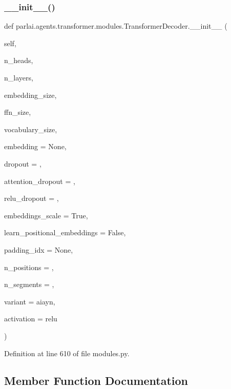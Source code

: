 \subsubsection{\texorpdfstring{\+\_\+\+\_\+init\+\_\+\+\_\+()}{\_\_init\_\_()}}
{\footnotesize\ttfamily def parlai.\+agents.\+transformer.\+modules.\+Transformer\+Decoder.\+\_\+\+\_\+init\+\_\+\+\_\+ (\begin{DoxyParamCaption}\item[{}]{self,  }\item[{}]{n\+\_\+heads,  }\item[{}]{n\+\_\+layers,  }\item[{}]{embedding\+\_\+size,  }\item[{}]{ffn\+\_\+size,  }\item[{}]{vocabulary\+\_\+size,  }\item[{}]{embedding = {\ttfamily None},  }\item[{}]{dropout = {},  }\item[{}]{attention\+\_\+dropout = {},  }\item[{}]{relu\+\_\+dropout = {},  }\item[{}]{embeddings\+\_\+scale = {\ttfamily True},  }\item[{}]{learn\+\_\+positional\+\_\+embeddings = {\ttfamily False},  }\item[{}]{padding\+\_\+idx = {\ttfamily None},  }\item[{}]{n\+\_\+positions = {},  }\item[{}]{n\+\_\+segments = {},  }\item[{}]{variant = {\ttfamily \textquotesingle{}aiayn\textquotesingle{}},  }\item[{}]{activation = {\ttfamily \textquotesingle{}relu\textquotesingle{}} }\end{DoxyParamCaption})}



Definition at line 610 of file modules.\+py.



\subsection{Member Function Documentation}
\mbox{\label{classparlai_1_1agents_1_1transformer_1_1modules_1_1TransformerDecoder_a19b2e9eecef1384bcfa9f772cac24a20}} 
